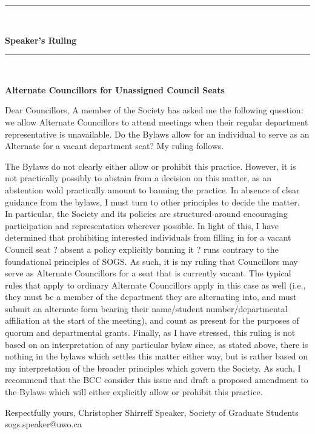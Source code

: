 \setcounter{section}{0}

\begin{center}
\rule{\textwidth}{3.6pt}\\[\baselineskip] %
\begin{Huge}
\textbf{Speaker's Ruling}
\end{Huge}

\rule{\textwidth}{3.6pt}\\[\baselineskip] %



\vspace*{2\baselineskip} %

{\large  \textbf{Alternate Councillors for Unassigned Council Seats}}
\end{center}

Dear Councillors,
	A member of the Society has asked me the following question: we allow Alternate Councillors to attend meetings when their regular department representative is unavailable. Do the Bylaws allow for an individual to serve as an Alternate for a vacant department seat? My ruling follows.
	
\begin{multicols}{2}
	The Bylaws do not clearly either allow or prohibit this practice. However, it is not practically possibly to abstain from a decision on this matter, as an abstention wold practically amount to banning the practice. In absence of clear guidance from the bylaws, I must turn to other principles to decide the matter. In particular, the Society and its policies are structured around encouraging participation and representation wherever possible. In light of this, I have determined that prohibiting interested individuals from filling in for a vacant Council seat ? absent a policy explicitly banning it ? runs contrary to the foundational principles of SOGS.
	As such, it is my ruling that Councillors may serve as Alternate Councillors for a seat that is currently vacant. The typical rules that apply to ordinary Alternate Councillors apply in this case as well (i.e., they must be a member of the department they are alternating into, and must submit an alternate form bearing their name/student number/departmental affiliation at the start of the meeting), and count as present for the purposes of quorum and departmental grants.
	Finally, as I have stressed, this ruling is not based on an interpretation of any particular bylaw since, as stated above, there is nothing in the bylaws which settles this matter either way, but is rather based on my interpretation of the broader principles which govern the Society. As such, I recommend that the BCC consider this issue and draft a proposed amendment to the Bylaws which will either explicitly allow or prohibit this practice.
\end{multicols}




\noindent
Respectfully yours, \newline
\noindent
Christopher Shirreff \newline
\indent
Speaker, \newline 
\indent
Society of Graduate Students \newline
\indent
sogs.speaker@uwo.ca \newline

